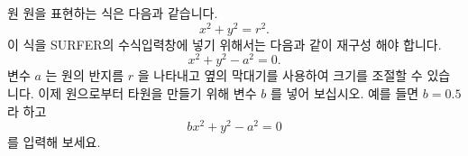 \begin{surferPage}{원}
원을 표현하는 식은 다음과 같습니다.
\[x^2+y^2=r^2.\]
이 식을 SURFER의 수식입력창에 넣기 위해서는 다음과 같이 재구성 해야 합니다.
\[x^2+y^2-a^2=0.\]
변수 $a$ 는 원의 반지름 $r$ 을 나타내고 옆의 막대기를 사용하여 크기를 조절할 수 있습니다. 이제 원으로부터 타원을 만들기 위해 변수 $b$ 를 넣어 보십시오. 예를 들면 $b=0.5$ 라 하고 \[bx^2+y^2-a^2=0\] 를 입력해 보세요.
\end{surferPage}
